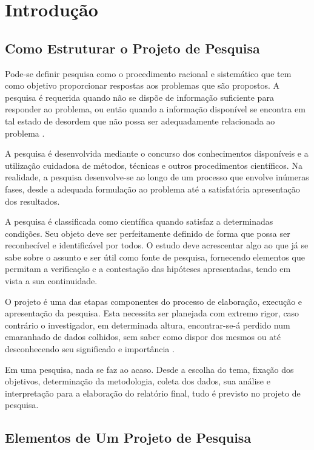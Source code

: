 \documentclass[
	12pt,				%
    oneside,			%
	a4paper,			%
	english,			%
	french,				%
	spanish,			%
	brazil				%
	]{abntex2}
\begin{document}
\chapter{Introdução}

\section{Como Estruturar o Projeto de Pesquisa}

Pode-se definir pesquisa como o procedimento racional e sistemático
que tem como objetivo proporcionar respostas aos problemas que são
propostos. A pesquisa é requerida quando não se dispõe de informação
suficiente para responder ao pro\-blema, ou então quando a
informação disponível se encontra em tal estado de desordem que não
possa ser adequadamente relacionada ao problema \cite{Gil}.

A pesquisa é desenvolvida mediante o concurso dos conhecimentos
disponíveis e a utilização cuidadosa de métodos, técnicas e outros
procedimentos científicos. Na realidade, a pesquisa desenvolve-se
ao longo de um processo que envolve inúmeras fases, desde a
adequada formulação ao problema até a satisfatória apresentação
dos resultados.

A pesquisa é classificada como científica quando satisfaz a
determinadas condi\-ções. Seu objeto deve ser  perfeitamente
definido de forma que possa ser reconhecível e identificável por
todos. O estudo deve acrescentar algo ao que já se sabe sobre o
assunto e ser útil como fonte de pesquisa, fornecendo elementos que
permitam a verificação e a contestação das hipóteses apresentadas,
tendo em vista a sua continuidade.

O projeto é uma das etapas componentes do processo de elaboração,
execução e apresentação da pesquisa. Esta necessita ser planejada
com extremo rigor, caso contrário o investigador, em determinada
altura, encontrar-se-á perdido num emaranhado de dados colhidos, sem
saber como dispor dos mesmos ou até desconhecendo seu significado e
importância \cite{Marconi}.

Em uma pesquisa, nada se faz ao acaso. Desde a escolha do tema,
fixação dos objetivos, determinação da metodologia, coleta dos
dados, sua análise e interpretação para a elaboração do relatório
final, tudo é previsto no projeto de pesquisa.


\section{Elementos de Um Projeto de Pesquisa}
\end{document}

